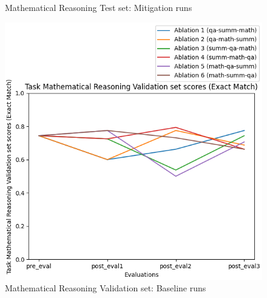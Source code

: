 \begin{figure}[H]
\begin{minipage}{0.45\textwidth}
        \captionsetup{width=1.1\textwidth}
        \caption{Mathematical Reasoning Test set: Mitigation runs}
        \label{MathAblationMitigation}
    \end{minipage}
\end{figure}

\begin{figure}[H]
    \centering
    \begin{minipage}{0.45\textwidth}
        \centering
        \includegraphics[width=1.1\textwidth]{Figures/results/trace_baseline_graphs/task_eval/math_val_Validation_baseline.png} %
        \captionsetup{width=1.1\textwidth}
        \caption{Mathematical Reasoning Validation set: Baseline 
        runs}
        \label{MathAblationValBaseline}
    \end{minipage}\hfill
    \begin{minipage}{0.45\textwidth}
        \centering

\end{minipage}
\end{figure}
